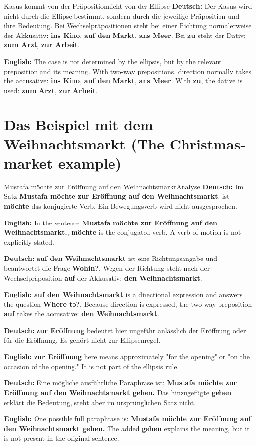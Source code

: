 \documentclass[a4paper,11pt]{article}
\newcommand{\GermanText}[1]{\textbf{Deutsch: }#1\par}
\newcommand{\EnglishText}[1]{{\small\color{SoftGray}\textbf{English: }#1\par}}
\begin{document}
        \begin{grammarentry}{Kasus kommt von der Präposition}{nicht von der Ellipse}
            \GermanText{Der Kasus wird nicht durch die Ellipse bestimmt, sondern durch die jeweilige Präposition und ihre Bedeutung. Bei Wechselpräpositionen steht bei einer Richtung normalerweise der Akkusativ: \textbf{ins Kino}, \textbf{auf den Markt}, \textbf{ans Meer}. Bei \textbf{zu} steht der Dativ: \textbf{zum Arzt}, \textbf{zur Arbeit}.}
            \EnglishText{The case is not determined by the ellipsis, but by the relevant preposition and its meaning. With two-way prepositions, direction normally takes the accusative: \textbf{ins Kino}, \textbf{auf den Markt}, \textbf{ans Meer}. With \textbf{zu}, the dative is used: \textbf{zum Arzt}, \textbf{zur Arbeit}.}
        \end{grammarentry}

    \section{Das Beispiel mit dem Weihnachtsmarkt \textnormal{(The Christmas-market example)}}

        \begin{grammarentry}{Mustafa möchte zur Eröffnung auf den Weihnachtsmarkt}{Analyse}
            \GermanText{Im Satz \textbf{Mustafa möchte zur Eröffnung auf den Weihnachtsmarkt.} ist \textbf{möchte} das konjugierte Verb. Ein Bewegungsverb wird nicht ausgesprochen.}
            \EnglishText{In the sentence \textbf{Mustafa möchte zur Eröffnung auf den Weihnachtsmarkt.}, \textbf{möchte} is the conjugated verb. A verb of motion is not explicitly stated.}

            \GermanText{\textbf{auf den Weihnachtsmarkt} ist eine Richtungsangabe und beantwortet die Frage \textbf{Wohin?}. Wegen der Richtung steht nach der Wechselpräposition \textbf{auf} der Akkusativ: \textbf{den Weihnachtsmarkt}.}
            \EnglishText{\textbf{auf den Weihnachtsmarkt} is a directional expression and answers the question \textbf{Where to?}. Because direction is expressed, the two-way preposition \textbf{auf} takes the accusative: \textbf{den Weihnachtsmarkt}.}

            \GermanText{\textbf{zur Eröffnung} bedeutet hier ungefähr \glqq anlässlich der Eröffnung\grqq{} oder \glqq für die Eröffnung\grqq{}. Es gehört nicht zur Ellipsenregel.}
            \EnglishText{\textbf{zur Eröffnung} here means approximately "for the opening" or "on the occasion of the opening." It is not part of the ellipsis rule.}

            \GermanText{Eine mögliche ausführliche Paraphrase ist: \textbf{Mustafa möchte zur Eröffnung auf den Weihnachtsmarkt gehen.} Das hinzugefügte \textbf{gehen} erklärt die Bedeutung, steht aber im ursprünglichen Satz nicht.}
            \EnglishText{One possible full paraphrase is: \textbf{Mustafa möchte zur Eröffnung auf den Weihnachtsmarkt gehen.} The added \textbf{gehen} explains the meaning, but it is not present in the original sentence.}
        \end{grammarentry}
\end{document}
